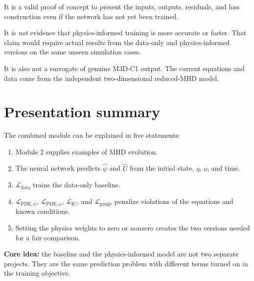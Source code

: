 \documentclass[11pt]{article}
\newcommand{\Ldata}{\mathcal L_{\mathrm{data}}}
\newcommand{\Lpdepsi}{\mathcal L_{\mathrm{PDE},\psi}}
\newcommand{\Lpdeomega}{\mathcal L_{\mathrm{PDE},\omega}}
\newcommand{\Lic}{\mathcal L_{\mathrm{IC}}}
\newcommand{\Lgauge}{\mathcal L_{\mathrm{gauge}}}
\begin{document}
It is a valid proof of concept to present the inputs, outputs, residuals, and loss construction even if the network has not yet been trained.

It is \emph{not} evidence that physics-informed training is more accurate or faster. That claim would require actual results from the data-only and physics-informed versions on the same unseen simulation cases.

It is also not a surrogate of genuine M3D-C1 output. The current equations and data come from the independent two-dimensional reduced-MHD model.

\section{Presentation summary}

The combined module can be explained in five statements:
\begin{enumerate}[leftmargin=2em]
\item Module 2 supplies examples of MHD evolution.
\item The neural network predicts $\widehat\psi$ and $\widehat U$ from the initial state, $\eta$, $\nu$, and time.
\item $\Ldata$ trains the data-only baseline.
\item $\Lpdepsi$, $\Lpdeomega$, $\Lic$, and $\Lgauge$ penalize violations of the equations and known conditions.
\item Setting the physics weights to zero or nonzero creates the two versions needed for a fair comparison.
\end{enumerate}

\begin{overviewbox}
\textbf{Core idea:} the baseline and the physics-informed model are not two separate projects. They are the same prediction problem with different terms turned on in the training objective.
\end{overviewbox}
\end{document}
